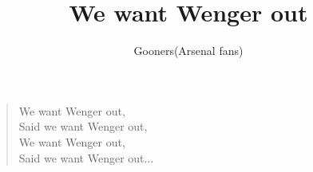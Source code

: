 \documentclass[a4paper,12pt]{article}
\title{We want Wenger out}
\author{Gooners(Arsenal fans)}
\date{}
\begin{document}
	
	\maketitle
	
	\begin{verse}
		
		We want Wenger out, \\
		Said we want Wenger out, \\
		We want Wenger out, \\
		Said we want Wenger out$\ldots$
		
	\end{verse}
	
\end{document}
